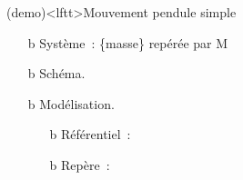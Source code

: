 \documentclass[../../main/main.tex]{subfiles}
\begin{document}
\begin{tcb*}[breakable](demo)<lftt>{Mouvement pendule simple}
	\begin{isd}[righthand ratio=.3, sidebyside align=top]
		\begin{enumerate}[label=\sqenumi]
			\item[b]{Système}~: \{masse\} repérée par M
			\item[b]{Schéma.}
			\item[b]{Modélisation.}
			      \begin{itemize}
				      \item[b]{Référentiel}~: 
				      \item[b]{Repère}~: %
			      \end{itemize}
		\end{enumerate}
		\tcblower
		\begin{center}
			\vspace{-12pt}
\end{center}
\end{isd}
\end{tcb*}
\end{document}
